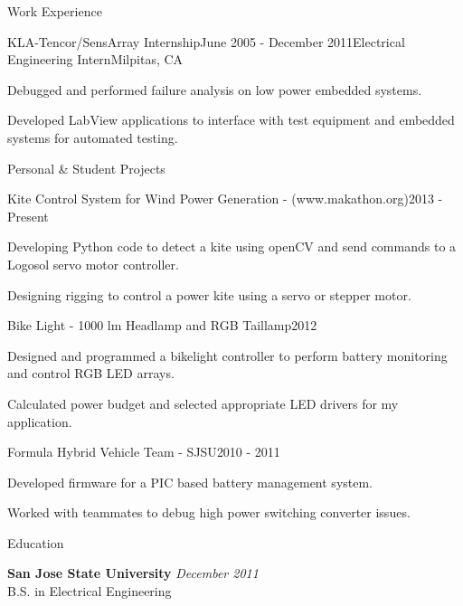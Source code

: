 \documentclass{resume} %
\begin{document}
\begin{rSection}{Work Experience}
\pagebreak[2]
\ssquish
\begin{rSubsection}{KLA-Tencor/SensArray Internship}{June 2005 - December 2011}{Electrical Engineering Intern}{Milpitas, CA}
\item Debugged and performed failure analysis on low power embedded systems. 
\item Developed LabView applications to interface with test equipment and embedded systems for automated testing.
\end{rSubsection}
\end{rSection}

\pagebreak[3]
\begin{rSection}{Personal \& Student Projects}

\ssquish
\begin{rProject}{Kite Control System for Wind Power Generation - (www.makathon.org)}{2013 - Present}
\item Developing Python code to detect a kite using openCV and send commands to a Logosol servo motor controller.
\item Designing rigging to control a power kite using a servo or stepper motor.
\end{rProject}

\ssquish
\begin{rProject}{Bike Light - 1000 lm Headlamp and RGB Taillamp}{2012}
\item Designed and programmed a bikelight controller to perform battery monitoring and control RGB LED arrays.
\item Calculated power budget and selected appropriate LED drivers for my application.
\end{rProject}

\ssquish
\begin{rProject}{Formula Hybrid Vehicle Team - SJSU}{2010 - 2011}
\item Developed firmware for a PIC based battery management system.
\item Worked with teammates to debug high power switching converter issues.
\end{rProject}
\end{rSection}


\pagebreak[3]
\begin{rSection}{Education}

{\bf San Jose State University} \hfill {\em December 2011} \\ 
B.S. in Electrical Engineering \\

\end{rSection}
\end{document}
